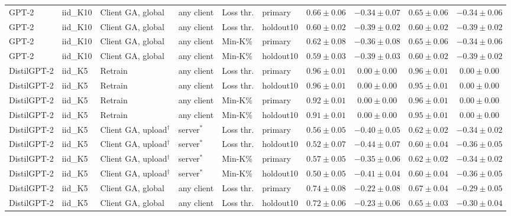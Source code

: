{\begin{longtable}{@{\extracolsep{\fill}}llllllcccc@{}}
GPT-2 & iid\_K10 & Client GA, global & any client & Loss thr. & primary & $0.66 \pm 0.06$ & $-0.34 \pm 0.07$ & $0.65 \pm 0.06$ & $-0.34 \pm 0.06$ \\
GPT-2 & iid\_K10 & Client GA, global & any client & Loss thr. & holdout10 & $0.60 \pm 0.02$ & $-0.39 \pm 0.02$ & $0.60 \pm 0.02$ & $-0.39 \pm 0.02$ \\
GPT-2 & iid\_K10 & Client GA, global & any client & Min-K\% & primary & $0.62 \pm 0.08$ & $-0.36 \pm 0.08$ & $0.65 \pm 0.06$ & $-0.34 \pm 0.06$ \\
GPT-2 & iid\_K10 & Client GA, global & any client & Min-K\% & holdout10 & $0.59 \pm 0.03$ & $-0.39 \pm 0.03$ & $0.60 \pm 0.02$ & $-0.39 \pm 0.02$ \\
DistilGPT-2 & iid\_K5 & Retrain & any client & Loss thr. & primary & $0.96 \pm 0.01$ & $0.00 \pm 0.00$ & $0.96 \pm 0.01$ & $0.00 \pm 0.00$ \\
DistilGPT-2 & iid\_K5 & Retrain & any client & Loss thr. & holdout10 & $0.96 \pm 0.01$ & $0.00 \pm 0.00$ & $0.95 \pm 0.01$ & $0.00 \pm 0.00$ \\
DistilGPT-2 & iid\_K5 & Retrain & any client & Min-K\% & primary & $0.92 \pm 0.01$ & $0.00 \pm 0.00$ & $0.96 \pm 0.01$ & $0.00 \pm 0.00$ \\
DistilGPT-2 & iid\_K5 & Retrain & any client & Min-K\% & holdout10 & $0.91 \pm 0.01$ & $0.00 \pm 0.00$ & $0.95 \pm 0.01$ & $0.00 \pm 0.00$ \\
DistilGPT-2 & iid\_K5 & Client GA, upload$^{\dagger}$ & server$^{*}$ & Loss thr. & primary & $0.56 \pm 0.05$ & $-0.40 \pm 0.05$ & $0.62 \pm 0.02$ & $-0.34 \pm 0.02$ \\
DistilGPT-2 & iid\_K5 & Client GA, upload$^{\dagger}$ & server$^{*}$ & Loss thr. & holdout10 & $0.52 \pm 0.07$ & $-0.44 \pm 0.07$ & $0.60 \pm 0.04$ & $-0.36 \pm 0.05$ \\
DistilGPT-2 & iid\_K5 & Client GA, upload$^{\dagger}$ & server$^{*}$ & Min-K\% & primary & $0.57 \pm 0.05$ & $-0.35 \pm 0.06$ & $0.62 \pm 0.02$ & $-0.34 \pm 0.02$ \\
DistilGPT-2 & iid\_K5 & Client GA, upload$^{\dagger}$ & server$^{*}$ & Min-K\% & holdout10 & $0.50 \pm 0.05$ & $-0.41 \pm 0.04$ & $0.60 \pm 0.04$ & $-0.36 \pm 0.05$ \\
DistilGPT-2 & iid\_K5 & Client GA, global & any client & Loss thr. & primary & $0.74 \pm 0.08$ & $-0.22 \pm 0.08$ & $0.67 \pm 0.04$ & $-0.29 \pm 0.05$ \\
DistilGPT-2 & iid\_K5 & Client GA, global & any client & Loss thr. & holdout10 & $0.72 \pm 0.06$ & $-0.23 \pm 0.06$ & $0.65 \pm 0.03$ & $-0.30 \pm 0.04$ \\

\end{longtable}}
